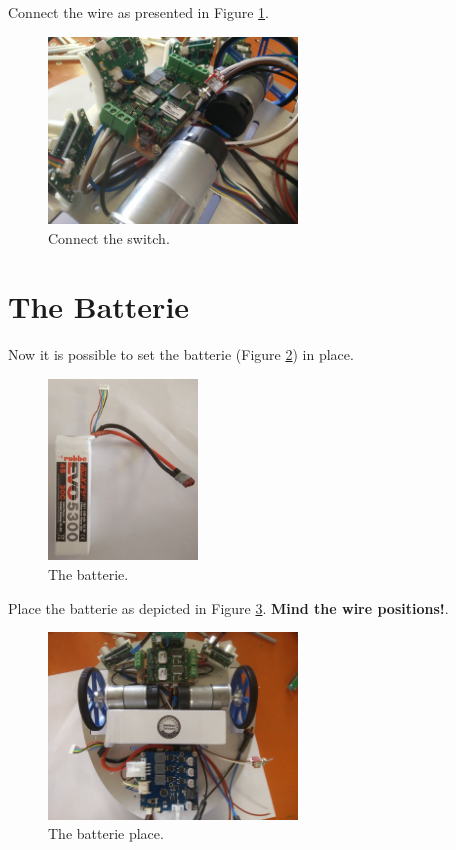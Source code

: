 \documentclass[10pt,a4paper]{report}   %
\begin{document}
Connect the wire as presented in Figure \ref{fig:44}.

\begin{figure}[H]
\center
\includegraphics[width=250px]{images/44.jpg}
\caption{Connect the switch.}
\label{fig:44}
\end{figure}

\section{The Batterie}

Now it is possible to set the batterie (Figure \ref{fig:45}) in place. 

\begin{figure}[H]
\center
\includegraphics[width=150px]{images/45.jpg}
\caption{The batterie.}
\label{fig:45}
\end{figure}

Place the batterie as depicted in Figure \ref{fig:46}. \textbf{Mind the wire positions!}.

\begin{figure}[H]
\center
\includegraphics[width=250px]{images/46.jpg}
\caption{The batterie place.}
\label{fig:46}
\end{figure}
\end{document}
